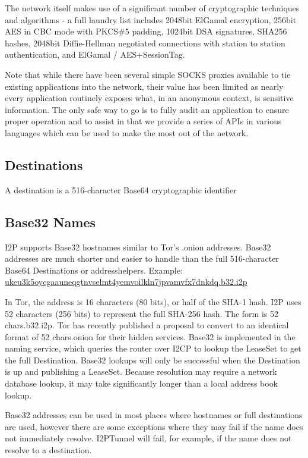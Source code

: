 \documentclass[a4paper,twocolumn,12pt]{article}
\begin{document}
The network itself makes use of a significant number of cryptographic techniques and algorithms - a full laundry list includes 2048bit ElGamal encryption, 256bit AES in CBC mode with PKCS\#5 padding, 1024bit DSA signatures, SHA256 hashes, 2048bit Diffie-Hellman negotiated connections with station to station authentication, and ElGamal / AES+SessionTag.

\vspace{2 em}

Note that while there have been several simple SOCKS proxies available to tie existing applications into the network, their value has been limited as nearly every application routinely exposes what, in an anonymous context, is sensitive information. The only safe way to go is to fully audit an application to ensure proper operation and to assist in that we provide a series of APIs in various languages which can be used to make the most out of the network.


\subsection{Destinations}

A destination is a 516-character Base64 cryptographic identifier

\subsection{Base32 Names}

I2P supports Base32 hostnames similar to Tor's .onion addresses. Base32 addresses are much shorter and easier to handle than the full 516-character Base64 Destinations or addresshelpers. Example: 
\url{ukeu3k5oycgaauneqgtnvselmt4yemvoilkln7jpvamvfx7dnkdq.b32.i2p}

In Tor, the address is 16 characters (80 bits), or half of the SHA-1 hash.
\cite{tor-hiddenservice}
I2P uses 52 characters (256 bits) to represent the full SHA-256 hash. The form is {52 chars}.b32.i2p. Tor has recently published a proposal to convert to an identical format of {52 chars}.onion for their hidden services. Base32 is implemented in the naming service, which queries the router over I2CP to lookup the LeaseSet to get the full Destination. Base32 lookups will only be successful when the Destination is up and publishing a LeaseSet. Because resolution may require a network database lookup, it may take significantly longer than a local address book lookup.

Base32 addresses can be used in most places where hostnames or full destinations are used, however there are some exceptions where they may fail if the name does not immediately resolve. I2PTunnel will fail, for example, if the name does not resolve to a destination.
\end{document}
